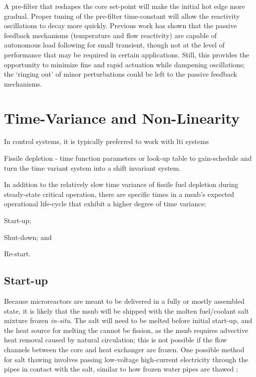 A pre-filter that reshapes the core set-point will make the initial hot edge more gradual. Proper tuning of the pre-filter time-constant will allow the reactivity oscillations to decay more quickly. Previous work \cite{CarterNumerical} has shown that the passive feedback mechanisms (temperature and flow reactivity) are capable of autonomous load following for small transient, though not at the level of performance that may be required in certain applications. Still, this provides the opportunity to minimize fine and rapid actuation while dampening oscillations; the `ringing out' of minor perturbations could be left to the passive feedback mechanisms.

\section{Time-Variance and Non-Linearity}
In control systems, it is typically preferred to work with \acf{lti} systems

Fissile depletion - time function parameters or look-up table to gain-schedule and turn the time variant system into a shift invariant system.

In addition to the relatively slow time variance of fissile fuel depletion during steady-state critical operation, there are specific times in a \acs{msnb}'s expected operational life-cycle that exhibit a higher degree of time variance: 
\begin{enumerate*}
\item Start-up; \item Shut-down; and \item Re-start.
\end{enumerate*}

\subsection{Start-up}
Because microreactors are meant to be delivered in a fully or mostly assembled state, it is likely that the \acs{msnb} will be shipped with the molten fuel/coolant salt mixture frozen \textit{in-situ}. The salt will need to be melted before initial start-up, and the heat source for melting the cannot be fission, as the \acs{msnb} requires advective heat removal caused by natural circulation; this is not possible if the flow channels between the core and heat exchanger are frozen. One possible method for salt thawing involves passing low-voltage high-current electricity through the pipes in contact with the salt, similar to how frozen water pipes are thawed \cite{Thawing};

